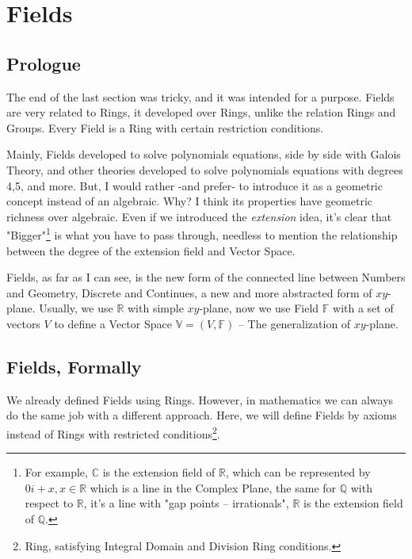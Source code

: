 \section{Fields \label{fields}}

\subsection{Prologue}
The end of the last section was tricky, and it was intended for a purpose. Fields are very related to Rings, it developed over Rings, unlike the relation Rings and Groups. Every Field is a Ring with certain restriction conditions.

Mainly, Fields developed to solve polynomials equations, side by side with Galois Theory, and other theories developed to solve polynomials equations with degrees 4,5, and more. But, I would rather -and prefer- to introduce it as a geometric concept instead of an algebraic. Why? I think its properties have geometric richness over algebraic. Even if we introduced the {\it extension} idea, it's clear that "Bigger"\footnote{For example, $\mathbb{C}$ is the extension field of $\mathbb{R}$, which can be represented by $0i+x, x \in \mathbb{R}$ which is a line in the Complex Plane, the same for $\mathbb{Q}$ with respect to $\mathbb{R}$, it's a line with "gap points -- irrationals", $\mathbb{R}$ is the extension field of $\mathbb{Q}$.  } is what you have to pass through, needless to mention the relationship between the degree of the extension field and Vector Space.

Fields, as far as I can see, is the new form of the connected line between Numbers and Geometry, Discrete and Continues, a new and more abstracted form of $xy$-plane. Usually, we use $\mathbb{R}$ with simple $xy$-plane, now we use Field $\mathbb{F}$ with a set of vectors $V$ to define a Vector Space $\mathbb{V}= (V, \mathbb{F})$ -- The generalization of $xy$-plane.

\subsection{Fields, Formally}
We already defined Fields using Rings. However, in mathematics we can always do the same job with a different approach. Here, we will define Fields by axioms instead of Rings with restricted conditions\footnote{Ring, satisfying Integral Domain and Division Ring conditions.}.

